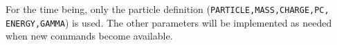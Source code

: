For the time being, only the particle definition
(\texttt{PARTICLE,MASS,CHARGE,PC,
ENERGY,GAMMA}) is used.
The other parameters will be implemented as needed when new commands
become available.
